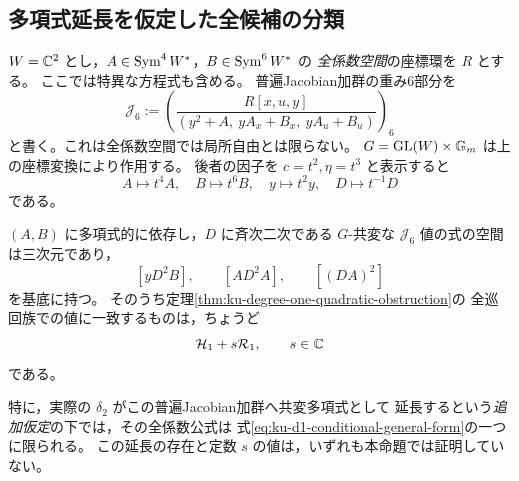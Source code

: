 \subsection{多項式延長を仮定した全候補の分類}

$W=\mathbb C^2$ とし，$A\in\operatorname{Sym}^4W^*$，$B\in\operatorname{Sym}^6W^*$ の
\emph{全係数空間}の座標環を $R$ とする。
ここでは特異な方程式も含める。
普遍Jacobian加群の重み6部分を
\[
 \mathscr J_6:=
 \left(\frac{R[x,u,y]}{(y^2+A,\ yA_x+B_x,\ yA_u+B_u)}\right)_6
\]
と書く。これは全係数空間では局所自由とは限らない。
$G=\operatorname{GL}(W)\times\mathbb G_m$ は上の座標変換により作用する。
後者の因子を $c=t^2,\eta=t^3$ と表示すると
\[
 A\mapsto t^4A,\quad B\mapsto t^6B,\quad
 y\mapsto t^2y,\quad D\mapsto t^{-1}D
\]
である。

\begin{proposition}[多項式延長の下で残る一つの定数]
\label{prop:ku-d1-polynomial-classification}
$(A,B)$ に多項式的に依存し，$D$ に斉次二次である
$G$-共変な $\mathscr J_6$ 値の式の空間は三次元であり，
\begin{equation}\label{eq:ku-d1-polynomial-basis}
                 [yD^2B],\qquad[A D^2A],\qquad[(DA)^2]
\end{equation}
を基底に持つ。
そのうち定理\ref{thm:ku-degree-one-quadratic-obstruction}の
全巡回族での値に一致するものは，ちょうど
\begin{equation}\label{eq:ku-d1-conditional-general-form}
                         \mathcal H_1+s\mathcal R_1,
                         \qquad s\in\mathbb C
\end{equation}
である。

特に，実際の $\delta_2$ がこの普遍Jacobian加群へ共変多項式として
延長するという\emph{追加仮定}の下では，その全係数公式は
式\eqref{eq:ku-d1-conditional-general-form}の一つに限られる。
この延長の存在と定数 $s$ の値は，いずれも本命題では証明していない。
\end{proposition}
